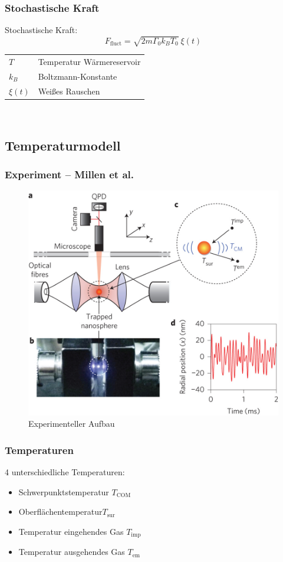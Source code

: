 \documentclass{beamer}
\begin{document}
\begin{frame}
\frametitle{Stochastische Kraft}
Stochastische Kraft:
\begin{equation}
    \label{eq:ffluct}
    F_\text{fluct} = \sqrt{2m\Gamma_0k_BT_0} \ \xi\left(t\right)
\end{equation}
\begin{tabular}{l l}
$T$ & Temperatur Wärmereservoir\\
$k_B$ & Boltzmann-Konstante\\
$\xi(t)$ & Weißes Rauschen\\
\end{tabular}\\
\end{frame}


\subsection{Temperaturmodell}
\begin{frame}
\frametitle{Experiment -- Millen et al.}
\begin{center}
\begin{figure}
\includegraphics[scale=0.2]{../images/nnano_millen.jpg}
\caption{Experimenteller Aufbau \cite{MillenJ.2014}}
\end{figure}
\end{center}
\end{frame}

\begin{frame}
\frametitle{Temperaturen}
4 unterschiedliche Temperaturen:
\begin{itemize}
\item Schwerpunktstemperatur $T_\text{COM}$
\item Oberflächentemperatur$T_\text{sur}$
\item Temperatur eingehendes Gas $T_\text{imp}$
\item Temperatur ausgehendes Gas $T_\text{em}$
\end{itemize}
\end{frame}
\end{document}
